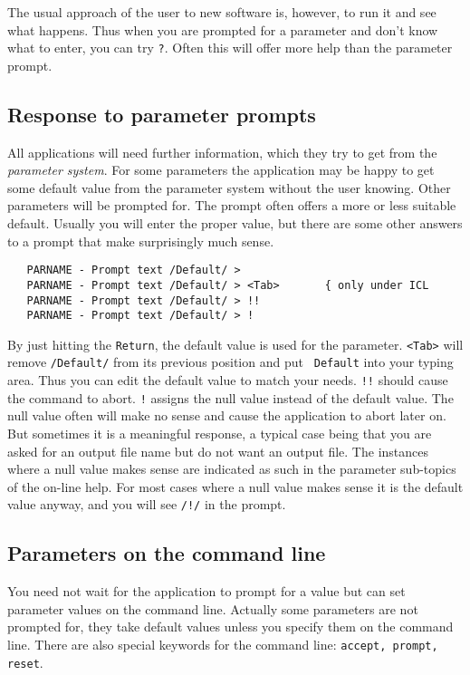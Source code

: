 The usual approach of the user to new software is, however, to run it
and see what happens. Thus when you are prompted for a parameter and
don't know what to enter, you can try {\tt ?}.  Often this will offer
more help than the parameter prompt.

\goodbreak
\subsection{Response to parameter prompts}

All applications will need further information, which they try to get from the
{\it parameter system}. For some parameters the application may be happy to get
some default value from the parameter system without the user knowing. Other
parameters will be prompted for. The prompt often offers a more or less
suitable default. Usually you will enter the proper value, but
there are some other answers to a prompt that make surprisingly much sense.

\begin{verbatim}
   PARNAME - Prompt text /Default/ > 
   PARNAME - Prompt text /Default/ > <Tab>       { only under ICL
   PARNAME - Prompt text /Default/ > !!
   PARNAME - Prompt text /Default/ > !
\end{verbatim}

By just hitting the {\tt Return}, the default value is used for the parameter.
{\tt <Tab>} will remove {\tt /Default/} from its previous position and put {\tt
Default} into your typing area. Thus you can edit the default value to match
your needs. {\tt !!} should cause the command to abort. {\tt !} assigns the
null value instead of the default value. The null value often will make no
sense and cause the application to abort later on. But sometimes it is a
meaningful response, a typical case being that you are asked for an output
file name but do not want an output file. The instances where a null value
makes sense are indicated as such in the parameter sub-topics of the on-line
help. For most cases where a null value makes sense it is the default value
anyway, and you will see {\tt /!/} in the prompt.

\goodbreak
\subsection{Parameters on the command line}

You need not wait for the application to prompt for a value but can set
parameter values on the command line. Actually some parameters are not prompted
for, they take default values unless you specify them on the command line.
There are also special keywords for the command line: {\tt accept, prompt,
reset}.

